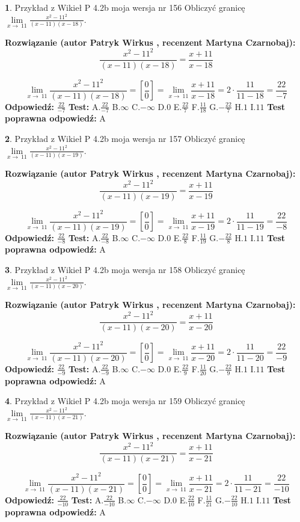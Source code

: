 \documentclass[12pt, a4paper]{article}
\theoremstyle{definition} %
\newtheorem{zad}{}
\newcommand{\zadStart}[1]{\begin{zad}#1\newline}
\newcommand{\zadStop}{\end{zad}}
\newcommand{\rozwStart}[2]{\noindent \textbf{Rozwiązanie (autor #1 , recenzent #2): }\newline}
\newcommand{\rozwStop}{\newline}
\newcommand{\odpStart}{\noindent \textbf{Odpowiedź:}\newline}
\newcommand{\odpStop}{\newline}
\newcommand{\testStart}{\noindent \textbf{Test:}\newline}
\newcommand{\testStop}{\newline}
\newcommand{\kluczStart}{\noindent \textbf{Test poprawna odpowiedź:}\newline}
\newcommand{\kluczStop}{\newline}
\begin{document}
\zadStart{Przykład z Wikieł P 4.2b moja wersja nr 156}
Obliczyć granicę $\lim\limits_{x\to\ 11}\frac{x^{2}-11^{2}}{(x-11)(x-18)}$.
\zadStop
\rozwStart{Patryk Wirkus}{Martyna Czarnobaj}
$$\frac{x^{2}-11^{2}}{(x-11)(x-18)}=\frac{x+11}{x-18}$$

$$\lim\limits_{x\to\ 11}\frac{x^{2}-11^{2}}{(x-11)(x-18)}=[\frac{0}{0}]=\lim\limits_{x\to\ 11}\frac{x+11}{x-18}=2 \cdot \frac{11}{11-18} = \frac{22}{-7}$$
\rozwStop
\odpStart
$\frac{22}{-7}$
\odpStop
\testStart
A.$\frac{22}{-7}$
B.$\infty$
C.$-\infty$
D.$0$
E.$\frac{22}{7}$
F.$\frac{11}{18}$
G.$-\frac{22}{7}$
H.$1$
I.$11$
\testStop
\kluczStart
A
\kluczStop



\zadStart{Przykład z Wikieł P 4.2b moja wersja nr 157}
Obliczyć granicę $\lim\limits_{x\to\ 11}\frac{x^{2}-11^{2}}{(x-11)(x-19)}$.
\zadStop
\rozwStart{Patryk Wirkus}{Martyna Czarnobaj}
$$\frac{x^{2}-11^{2}}{(x-11)(x-19)}=\frac{x+11}{x-19}$$

$$\lim\limits_{x\to\ 11}\frac{x^{2}-11^{2}}{(x-11)(x-19)}=[\frac{0}{0}]=\lim\limits_{x\to\ 11}\frac{x+11}{x-19}=2 \cdot \frac{11}{11-19} = \frac{22}{-8}$$
\rozwStop
\odpStart
$\frac{22}{-8}$
\odpStop
\testStart
A.$\frac{22}{-8}$
B.$\infty$
C.$-\infty$
D.$0$
E.$\frac{22}{8}$
F.$\frac{11}{19}$
G.$-\frac{22}{8}$
H.$1$
I.$11$
\testStop
\kluczStart
A
\kluczStop



\zadStart{Przykład z Wikieł P 4.2b moja wersja nr 158}
Obliczyć granicę $\lim\limits_{x\to\ 11}\frac{x^{2}-11^{2}}{(x-11)(x-20)}$.
\zadStop
\rozwStart{Patryk Wirkus}{Martyna Czarnobaj}
$$\frac{x^{2}-11^{2}}{(x-11)(x-20)}=\frac{x+11}{x-20}$$

$$\lim\limits_{x\to\ 11}\frac{x^{2}-11^{2}}{(x-11)(x-20)}=[\frac{0}{0}]=\lim\limits_{x\to\ 11}\frac{x+11}{x-20}=2 \cdot \frac{11}{11-20} = \frac{22}{-9}$$
\rozwStop
\odpStart
$\frac{22}{-9}$
\odpStop
\testStart
A.$\frac{22}{-9}$
B.$\infty$
C.$-\infty$
D.$0$
E.$\frac{22}{9}$
F.$\frac{11}{20}$
G.$-\frac{22}{9}$
H.$1$
I.$11$
\testStop
\kluczStart
A
\kluczStop



\zadStart{Przykład z Wikieł P 4.2b moja wersja nr 159}
Obliczyć granicę $\lim\limits_{x\to\ 11}\frac{x^{2}-11^{2}}{(x-11)(x-21)}$.
\zadStop
\rozwStart{Patryk Wirkus}{Martyna Czarnobaj}
$$\frac{x^{2}-11^{2}}{(x-11)(x-21)}=\frac{x+11}{x-21}$$

$$\lim\limits_{x\to\ 11}\frac{x^{2}-11^{2}}{(x-11)(x-21)}=[\frac{0}{0}]=\lim\limits_{x\to\ 11}\frac{x+11}{x-21}=2 \cdot \frac{11}{11-21} = \frac{22}{-10}$$
\rozwStop
\odpStart
$\frac{22}{-10}$
\odpStop
\testStart
A.$\frac{22}{-10}$
B.$\infty$
C.$-\infty$
D.$0$
E.$\frac{22}{10}$
F.$\frac{11}{21}$
G.$-\frac{22}{10}$
H.$1$
I.$11$
\testStop
\kluczStart
A
\kluczStop
\end{document}
